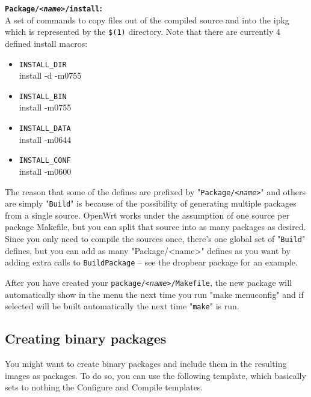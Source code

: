 \textbf{\texttt{Package/\textit{<name>}/install}:} \\
   A set of commands to copy files out of the compiled source and into the ipkg
   which is represented by the \texttt{\$(1)} directory. Note that there are currently
   4 defined install macros:
   \begin{itemize}
       \item \texttt{INSTALL\_DIR} \\
           install -d -m0755
       \item \texttt{INSTALL\_BIN} \\
           install -m0755
       \item \texttt{INSTALL\_DATA} \\
           install -m0644
       \item \texttt{INSTALL\_CONF} \\
           install -m0600
   \end{itemize}

The reason that some of the defines are prefixed by "\texttt{Package/\textit{<name>}}"
and others are simply "\texttt{Build}" is because of the possibility of generating
multiple packages from a single source. OpenWrt works under the assumption of one
source per package Makefile, but you can split that source into as many packages as
desired. Since you only need to compile the sources once, there's one global set of
"\texttt{Build}" defines, but you can add as many "Package/<name>" defines as you want
by adding extra calls to \texttt{BuildPackage} -- see the dropbear package for an example.

After you have created your \texttt{package/\textit{<name>}/Makefile}, the new package
will automatically show in the menu the next time you run "make menuconfig" and if selected
will be built automatically the next time "\texttt{make}" is run.

\subsection{Creating binary packages}

You might want to create binary packages and include them in the resulting images as packages.
To do so, you can use the following template, which basically sets to nothing the Configure and
Compile templates.

